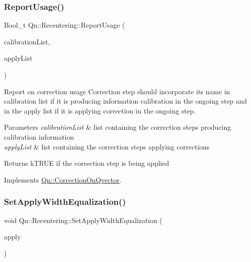 \mbox{\label{classQn_1_1Recentering_a06240f91a7656df95ac5aa55773b056a}} 
\subsubsection{\texorpdfstring{Report\+Usage()}{ReportUsage()}}
{\footnotesize\ttfamily Bool\+\_\+t Qn\+::\+Recentering\+::\+Report\+Usage (\begin{DoxyParamCaption}\item[{T\+List $\ast$}]{calibration\+List,  }\item[{T\+List $\ast$}]{apply\+List }\end{DoxyParamCaption})\hspace{0.3cm}{\ttfamily [virtual]}}

Report on correction usage Correction step should incorporate its name in calibration list if it is producing information calibration in the ongoing step and in the apply list if it is applying correction in the ongoing step. 
\begin{DoxyParams}{Parameters}
{\em calibration\+List} & list containing the correction steps producing calibration information \\
\hline
{\em apply\+List} & list containing the correction steps applying corrections \\
\hline
\end{DoxyParams}
\begin{DoxyReturn}{Returns}
k\+T\+R\+UE if the correction step is being applied 
\end{DoxyReturn}


Implements \mbox{\hyperlink{classQn_1_1CorrectionOnQvector_a322860c299f0ca1db46ddd57c0828ba1}{Qn\+::\+Correction\+On\+Qvector}}.

\mbox{\label{classQn_1_1Recentering_aec92eae9a164c6bb97f50edb7ba3bff6}} 
\subsubsection{\texorpdfstring{Set\+Apply\+Width\+Equalization()}{SetApplyWidthEqualization()}}
{\footnotesize\ttfamily void Qn\+::\+Recentering\+::\+Set\+Apply\+Width\+Equalization (\begin{DoxyParamCaption}\item[{Bool\+\_\+t}]{apply }\end{DoxyParamCaption})\hspace{0.3cm}{\ttfamily [inline]}}

